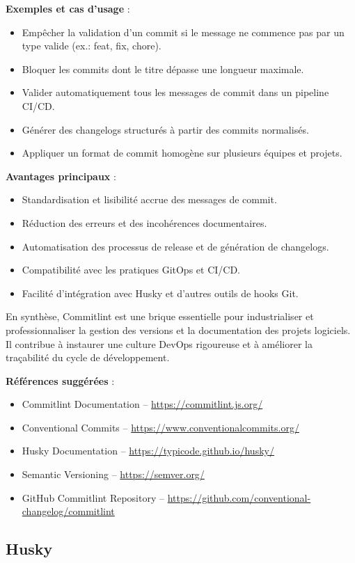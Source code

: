 \textbf{Exemples et cas d’usage} :
\begin{itemize}
	\item Empêcher la validation d’un commit si le message ne commence pas par un type valide (ex.: feat, fix, chore).
	\item Bloquer les commits dont le titre dépasse une longueur maximale.
	\item Valider automatiquement tous les messages de commit dans un pipeline CI/CD.
	\item Générer des changelogs structurés à partir des commits normalisés.
	\item Appliquer un format de commit homogène sur plusieurs équipes et projets.
\end{itemize}

\textbf{Avantages principaux} :
\begin{itemize}
	\item Standardisation et lisibilité accrue des messages de commit.
	\item Réduction des erreurs et des incohérences documentaires.
	\item Automatisation des processus de release et de génération de changelogs.
	\item Compatibilité avec les pratiques GitOps et CI/CD.
	\item Facilité d’intégration avec Husky et d’autres outils de hooks Git.
\end{itemize}

En synthèse, Commitlint est une brique essentielle pour industrialiser et professionnaliser la gestion des versions et la documentation des projets logiciels. Il contribue à instaurer une culture DevOps rigoureuse et à améliorer la traçabilité du cycle de développement.

\textbf{Références suggérées} :
\begin{itemize}
	\item Commitlint Documentation – \url{https://commitlint.js.org/}
	\item Conventional Commits – \url{https://www.conventionalcommits.org/}
	\item Husky Documentation – \url{https://typicode.github.io/husky/}
	\item Semantic Versioning – \url{https://semver.org/}
	\item GitHub Commitlint Repository – \url{https://github.com/conventional-changelog/commitlint}
\end{itemize}

\subsection{Husky}

